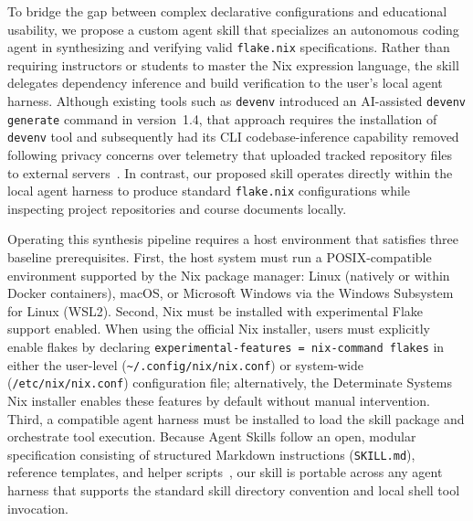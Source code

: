 To bridge the gap between complex declarative configurations and educational
usability, we propose a custom agent skill that specializes an autonomous coding agent
in synthesizing and verifying valid \texttt{flake.nix} specifications. Rather than
requiring instructors or students to master the Nix expression language, the
skill delegates dependency inference and build verification to the user's local
agent harness. Although existing tools such as \texttt{devenv} introduced an AI-assisted
\texttt{devenv generate} command in version~1.4, that approach requires the
installation of \texttt{devenv} tool and subsequently had its CLI codebase-inference
capability removed following privacy concerns over telemetry that uploaded tracked
repository files to external servers~\cite{goodingDevenvFacesBacklash2025}. In
contrast, our proposed skill operates directly within the local agent harness to produce
standard \texttt{flake.nix} configurations while inspecting project repositories
and course documents locally.

Operating this synthesis pipeline requires a host environment that satisfies
three baseline prerequisites. First, the host system must run a POSIX-compatible
environment supported by the Nix package manager: Linux (natively or within
Docker containers), macOS, or Microsoft Windows via the Windows Subsystem for Linux
(WSL2). Second, Nix must be installed with experimental Flake support enabled.
When using the official Nix installer, users must explicitly enable flakes by declaring
\texttt{experimental-features = nix-command flakes} in either the user-level (\texttt{\textasciitilde/.config/nix/nix.conf})
or system-wide (\texttt{/etc/nix/nix.conf}) configuration file; alternatively,
the Determinate Systems Nix installer enables these features by default without
manual intervention. Third, a compatible agent harness must be installed to load
the skill package and orchestrate tool execution. Because Agent Skills follow an open,
modular specification consisting of structured Markdown instructions (\texttt{SKILL.md}),
reference templates, and helper scripts~\cite{AgentSkills,lingAgentSkillsDataDriven2026},
our skill is portable across any agent harness that supports the standard skill
directory convention and local shell tool invocation.

